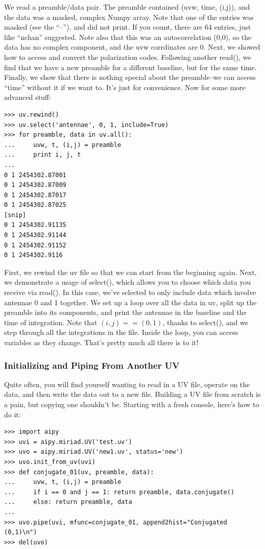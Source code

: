 We read a preamble/data pair.  The preamble contained (uvw, time, (i,j)), and
the data was a masked, complex Numpy array.  Note that one of the entries was
masked (see the ``--''), and did not print.  If you count, there are 64
entries, just like ``nchan'' suggested.  Note also that this was an
autocorrelation (0,0), so the data has no complex component, and the uvw
corrdinates are 0.  Next, we showed how to access and convert the polarization
codes.  Following another read(), we find that we have a new preamble for
a different baseline, but for the same time.  Finally, we show that there
is nothing special about the preamble--we can access ``time'' without it if we
want to.  It's just for convenience.  Now for some more advanced stuff:

\begin{verbatim}
>>> uv.rewind()
>>> uv.select('antennae', 0, 1, include=True)
>>> for preamble, data in uv.all():
...     uvw, t, (i,j) = preamble
...     print i, j, t
...
0 1 2454302.87001
0 1 2454302.87009
0 1 2454302.87017
0 1 2454302.87025
[snip]
0 1 2454302.91135
0 1 2454302.91144
0 1 2454302.91152
0 1 2454302.9116
\end{verbatim}

First, we rewind the uv file so that we can start from the beginning again.
Next, we demonstrate a usage of select(), which allows you to choose which data
you receive via read().  In this case, we've selected to only include data
which involve antennae 0 and 1 together.  We set up a loop over all the
data in uv, split up the preamble into its components, and print the antennae
in the baseline and the time of integration.  Note that $(i,j) == (0,1)$, 
thanks to select(), and we step through all the integrations in the file.
Inside the loop, you can access variables as they change.  That's pretty much
all there is to it!

\subsubsection{Initializing and Piping From Another UV}

Quite often, you will find yourself wanting to read in a UV file, operate
on the data, and then write the data out to a new file.  Building a UV file
from scratch is a pain, but copying one shouldn't be.  Starting with a fresh
console, here's how to do it:

\begin{verbatim}
>>> import aipy
>>> uvi = aipy.miriad.UV('test.uv')
>>> uvo = aipy.miriad.UV('new1.uv', status='new')
>>> uvo.init_from_uv(uvi)
>>> def conjugate_01(uv, preamble, data):
...     uvw, t, (i,j) = preamble
...     if i == 0 and j == 1: return preamble, data.conjugate()
...     else: return preamble, data
...
>>> uvo.pipe(uvi, mfunc=conjugate_01, append2hist="Conjugated (0,1)\n")
>>> del(uvo)
\end{verbatim}

